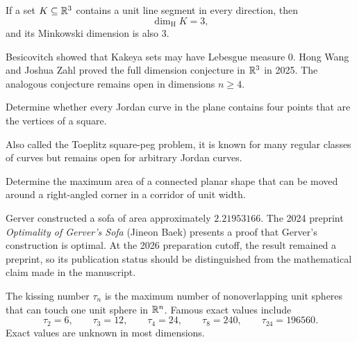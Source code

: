     \begin{theorem}
        If a set $K\subseteq\mathbb{R}^3$ contains a unit line segment in every
        direction, then
        \[
            \dim_{\mathrm{H}}K=3,
        \]
        and its Minkowski dimension is also $3$.
    \end{theorem}

    \begin{remark}
        Besicovitch showed that Kakeya sets may have Lebesgue measure $0$.
        Hong Wang and Joshua Zahl proved the full dimension conjecture in
        $\mathbb{R}^3$ in 2025. The analogous conjecture remains open in dimensions
        $n\geq 4$.
    \end{remark}

    \begin{openproblem}
        Determine whether every Jordan curve in the plane contains four points
        that are the vertices of a square.
    \end{openproblem}

    \begin{remark}
        Also called the Toeplitz square-peg problem, it is known for many
        regular classes of curves but remains open for arbitrary Jordan curves.
    \end{remark}


    \begin{openproblem}
        Determine the maximum area of a connected planar shape that can be moved
        around a right-angled corner in a corridor of unit width.
    \end{openproblem}

    \begin{remark}
        Gerver constructed a sofa of area approximately $2.21953166$. The 2024
        preprint \textit{Optimality of Gerver's Sofa} (Jineon Baek) presents a
        proof that Gerver's construction is optimal. At the 2026 preparation
        cutoff, the result remained a preprint, so its publication status should
        be distinguished from the mathematical claim made in the manuscript.
    \end{remark}

    \begin{fact}
        The kissing number $\tau_n$ is the maximum number of nonoverlapping unit
        spheres that can touch one unit sphere in $\mathbb{R}^n$. Famous exact values
        include
        \[
            \tau_2=6,\qquad
            \tau_3=12,\qquad
            \tau_4=24,\qquad
            \tau_8=240,\qquad
            \tau_{24}=196560.
        \]
        Exact values are unknown in most dimensions.
    \end{fact}

